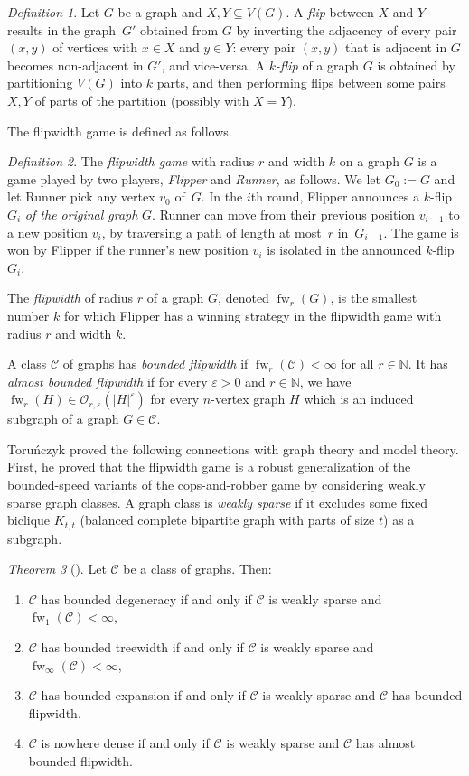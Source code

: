 \documentclass[1p,number,a4paper]{elsarticle}
\theoremstyle{remark}
\newcommand{\Oof}{\mathcal{O}}
\newcommand{\Cc}{\mathscr{C}}
\newcommand{\N}{\mathbb{N}}
\renewcommand{\epsilon}{\varepsilon}
\DeclareMathOperator{\fw}{fw}
\newtheorem{theorem}{Theorem}[section]
\newtheorem{definition}[theorem]{Definition}
\begin{document}
\begin{definition}
Let $G$ be a graph and $X,Y\subseteq V(G)$. 
A \emph{flip} between $X$ and $Y$ results in the graph~$G'$ obtained from $G$ by inverting the adjacency of every pair $(x,y)$ of vertices with $x\in X$ and $y\in Y$:
every pair $(x,y)$ that is adjacent in $G$ becomes non-adjacent in $G'$, and vice-versa.
A \emph{$k$-flip} of a graph $G$ is obtained by partitioning $V(G)$ 
into $k$ parts, and then performing flips between some pairs $X,Y$ of parts of the partition (possibly with $X=Y$).
\end{definition}

The flipwidth game is defined as follows. 

\begin{definition}
The \emph{flipwidth game} with radius $r$ and width $k$ on a graph $G$ is a game played by two players, \emph{Flipper} and \emph{Runner}, as follows.
We let $G_0:=G$ and let Runner pick any vertex $v_0$ of~$G$.
In the $i$th round, Flipper announces a $k$-flip $G_i$ \emph{of the original graph} $G$.
Runner can move from their previous position $v_{i-1}$ to a new position $v_i$, by traversing a path of length at most~$r$ in~$G_{i-1}$. 
The game is won by Flipper if the runner's new position $v_i$ is isolated in the announced $k$-flip $G_i$.

The \emph{flipwidth} of radius $r$ of a graph $G$, denoted $\fw_r(G)$, is the smallest number $k$ for which Flipper has a winning strategy in the flipwidth game with radius $r$ and width $k$. 

A class $\Cc$ of graphs has \emph{bounded flipwidth} if $\fw_r(\Cc)<\infty$ for all $r\in \N$. 
It has \emph{almost bounded flipwidth}
if for every $\epsilon>0$ and $r\in\N$,
we have $\fw_r(H)\in \Oof_{r,\epsilon}(|H|^{\epsilon})$ for every
$n$-vertex graph $H$ which is an induced subgraph of a graph $G\in \Cc$.
\end{definition}


Toru\'nczyk proved the following connections with graph theory and model theory. 
First, he proved that the flipwidth game is a robust generalization of the bounded-speed variants of the cops-and-robber game by considering weakly sparse graph classes. 
A graph class is \emph{weakly sparse} if it
excludes some fixed biclique $K_{t,t}$ (balanced complete bipartite graph with parts of size $t$) as a subgraph.

\begin{theorem}[\cite{torunczyk2023flip}]
  Let $\Cc$ be a class of graphs.
  Then: 
  \begin{enumerate}
    \item $\Cc$ has bounded degeneracy if and only if $\Cc$ is weakly sparse and $\fw_1(\Cc)<\infty$,
     \item $\Cc$ has bounded treewidth if and only if $\Cc$ is weakly sparse and $\fw_\infty(\Cc)<\infty$,
    \item $\Cc$ has bounded expansion if and only if $\Cc$ is weakly sparse and $\Cc$ has bounded flipwidth.
    \item $\Cc$ is nowhere dense if and only if $\Cc$ is weakly sparse and $\Cc$ has almost bounded flipwidth. 
  \end{enumerate}  
\end{theorem}
\end{document}

